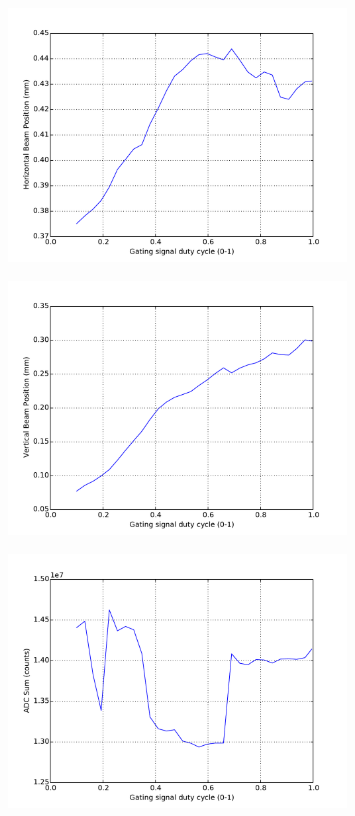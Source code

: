 \documentclass[a4paper, 11pt]{article}%
\begin{document}
%


\begin{figure}[htbp]%
\centering%
\includegraphics[width=0.8\textwidth]{./Results/scaled_DC_vs_X.pdf}%
\caption{}%
\end{figure}

%


\begin{figure}[htbp]%
\centering%
\includegraphics[width=0.8\textwidth]{./Results/scaled_DC_vs_Y.pdf}%
\caption{}%
\end{figure}

%


\begin{figure}[htbp]%
\centering%
\includegraphics[width=0.8\textwidth]{./Results/scaled_DC_vs_ADC_Sum.pdf}%
\caption{}%
\end{figure}

%
\end{document}
